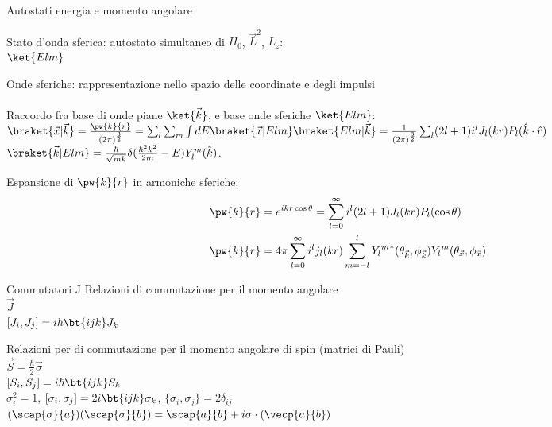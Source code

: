 \begin{frame}{Autostati energia e momento angolare}

Stato d'onda sferica: autostato simultaneo di $H_0$, $\vec{L}^2$, $L_z$:\\
$\ket{Elm}$

Onde sferiche: rappresentazione nello spazio delle coordinate e degli impulsi\\
\\

Raccordo fra base di onde piane $\ket{\vec{k}}$, e base onde sferiche $\ket{Elm}$:\\
$\braket{\vec{x}|\vec{k}}=\frac{\pw{k}{r}}{(2\pi)^{\frac{3}{2}}}=\sum_l\sum_m\int dE\braket{\vec{x}|Elm}\braket{Elm|\vec{k}}=\frac{1}{(2\pi)^{\frac{3}{2}}}\sum_l(2l+1)i^lJ_l(kr)P_l(\hat{k}\cdot\hat{r})$\\
$\braket{\vec{k}|Elm}=\frac{\hbar}{\sqrt{mk}}\delta(\frac{\hbar^2k^2}{2m}-E)Y_l^m(\hat{k})$.

Espansione di $\pw{k}{r}$ in armoniche sferiche:
\begin{align*}
&\pw{k}{r}=e^{ikr\cos{\theta}}=\sum_{l=0}^{\infty}i^l(2l+1)J_l(kr)P_l(\cos{\theta})\\
&\pw{k}{r}=4\pi\sum_{l=0}^{\infty}i^lj_l(kr)\sum_{m=-l}^l{{Y_l}^m}^*(\theta_{\vec{k}},\phi_{\vec{k}}){Y_l}^m(\theta_{\vec{x}},\phi_{\vec{x}})
\end{align*}


\end{frame}

\begin{frame}{Commutatori J}
     Relazioni di commutazione per il momento angolare\\
$\vec{J}$ \\
$[J_i,J_j]=i\hbar\bt{ijk}J_k$

 Relazioni per di commutazione per il momento angolare di spin (matrici di Pauli)\\
$\vec{S}=\frac{\hbar}{2}\vec{\sigma}$\\
$[S_i,S_j]=i\hbar\bt{ijk}S_k$\\
$\sigma_i^2=1$, $[\sigma_i,\sigma_j]=2i\bt{ijk}\sigma_k$, $\{\sigma_i,\sigma_j\}=2\delta_{ij}$\\
$(\scap{\sigma}{a})(\scap{\sigma}{b})=\scap{a}{b}+i\sigma\cdot(\vecp{a}{b})$
\end{frame}

